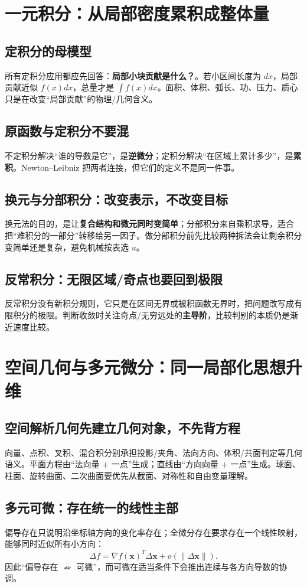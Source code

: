 \documentclass[11pt,a4paper,openany]{ctexbook}
\newcommand{\key}[1]{\textbf{\color{deep}#1}}\newcommand{\eng}[1]{\textit{#1}}\let\cleardoublepage\clearpage
\begin{document}
\chapter{一元积分：从局部密度累积成整体量}
\section{定积分的母模型}
所有定积分应用都应先回答：\key{局部小块贡献是什么？}。若小区间长度为 $dx$，局部贡献近似 $f(x)dx$，总量才是 $\int f(x)dx$。面积、体积、弧长、功、压力、质心只是在改变“局部贡献”的物理/几何含义。

\section{原函数与定积分不要混}
不定积分解决“谁的导数是它”，是\key{逆微分}；定积分解决“在区域上累计多少”，是\key{累积}。Newton--Leibniz 把两者连接，但它们的定义不是同一件事。

\section{换元与分部积分：改变表示，不改变目标}
换元法的目的，是让\key{复合结构和微元同时变简单}；分部积分来自乘积求导，适合把“难积分的一部分”转移给另一因子。做分部积分前先比较两种拆法会让剩余积分变简单还是复杂，避免机械按表选 $u$。

\section{反常积分：无限区域/奇点也要回到极限}
反常积分没有新积分规则，它只是在区间无界或被积函数无界时，把问题改写成有限积分的极限。判断收敛时关注奇点/无穷远处的\key{主导阶}，比较判别的本质仍是渐近速度比较。

\chapter{空间几何与多元微分：同一局部化思想升维}
\section{空间解析几何先建立几何对象，不先背方程}
向量、点积、叉积、混合积分别承担投影/夹角、法向方向、体积/共面判定等几何语义。平面方程由“法向量 + 一点”生成；直线由“方向向量 + 一点”生成。球面、柱面、旋转曲面、二次曲面要优先从截面、对称性和自由变量理解。

\section{多元可微：存在统一的线性主部}
偏导存在只说明沿坐标轴方向的变化率存在；全微分存在要求存在一个线性映射，能够同时近似所有小方向：
\[
\Delta f=\nabla f(\bm x)^T\Delta\bm x+o(\|\Delta\bm x\|).
\]
因此“偏导存在 $\not\Rightarrow$ 可微”，而可微在适当条件下会推出连续与各方向导数的协调。
\end{document}
